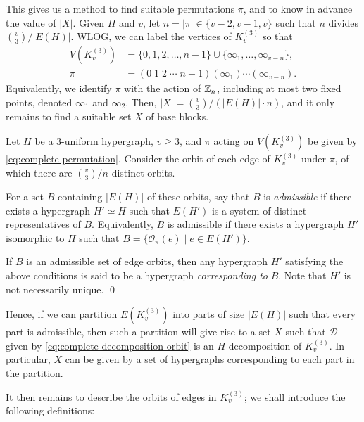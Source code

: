 This gives us a method to find suitable permutations $\pi$, and to know in advance the value of $|X|$. Given $H$ and $v$, let $n = |\pi| \in \{v-2, v-1, v\}$ such that $n$ divides ${v \choose 3}/|E(H)|$. WLOG, we can label the vertices of $K_{v}^{(3)}$ so that
\begin{align} \label{eq:complete-vertices}
    V(K_{v}^{(3)}) &= \{0, 1, 2, \ldots, n-1\} \cup \{\infty_1, \ldots, \infty_{v-n}\}, \\
    \label{eq:complete-permutation}
    \pi &= (0\;1\;2\;\cdots\;n-1)(\infty_1)\cdots(\infty_{v-n}).
\end{align}
Equivalently, we identify $\pi$ with the action of $\mathbb{Z}_n$, including at most two fixed points, denoted $\infty_1$ and $\infty_2$.
Then, $|X| = {v \choose 3}/(|E(H)| \cdot n)$, and it only remains to find a suitable set $X$ of base blocks.

\begin{definition} \label{def:admissible-orbits}
Let $H$ be a $3$-uniform hypergraph, $v \geq 3$, and $\pi$ acting on $V(K_{v}^{(3)})$ be given by \eqref{eq:complete-permutation}.
Consider the orbit of each edge of $K_{v}^{(3)}$ under $\pi$, of which there are ${v \choose 3}/n$ distinct orbits.

For a set $B$ containing $|E(H)|$ of these orbits, say that $B$ is {\em admissible} if there exists a hypergraph $H' \simeq H$ such that $E(H')$ is a system of distinct representatives of $B$. Equivalently, $B$ is admissible if there exists a hypergraph $H'$ isomorphic to $H$ such that $B = \{\mathcal{O}_\pi(e) \mid e \in E(H')\}$.

If $B$ is an admissible set of edge orbits, then any hypergraph $H'$ satisfying the above conditions is said to be a hypergraph {\em corresponding to} $B$. Note that $H'$ is not necessarily unique.
\qed
\end{definition}

Hence, if we can partition $E(K_{v}^{(3)})$ into parts of size $|E(H)|$ such that every part is admissible, then such a partition will give rise to a set $X$ such that $\mathcal{D}$ given by \eqref{eq:complete-decomposition-orbit} is an $H$-decomposition of $K_{v}^{(3)}$. In particular, $X$ can be given by a set of hypergraphs corresponding to each part in the partition.

It then remains to describe the orbits of edges in $K_{v}^{(3)}$; we shall introduce the following definitions:

